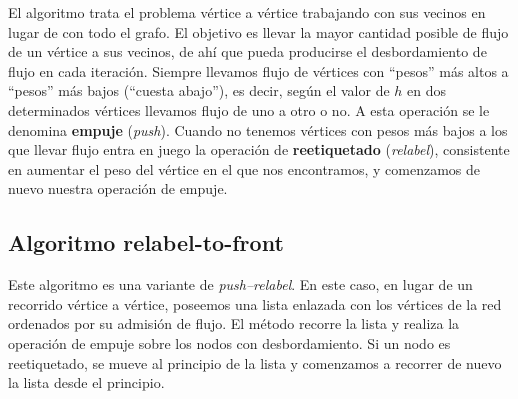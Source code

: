 El algoritmo trata el problema vértice a vértice trabajando con sus vecinos en lugar de con todo el grafo. El objetivo es llevar la mayor cantidad posible de flujo de un vértice a sus vecinos, de ahí que pueda producirse el desbordamiento de flujo en cada iteración. Siempre llevamos flujo de vértices con ``pesos'' más altos a ``pesos'' más bajos (``cuesta abajo''), es decir, según el valor de $h$ en dos determinados vértices llevamos flujo de uno a otro o no. A esta operación se le denomina \textbf{empuje} (\textit{push}). Cuando no tenemos vértices con pesos más bajos a los que llevar flujo entra en juego la operación de \textbf{reetiquetado} (\textit{relabel}), consistente en aumentar el peso del vértice en el que nos encontramos, y comenzamos de nuevo nuestra operación de empuje.

\subsection{Algoritmo relabel-to-front}

Este algoritmo es una variante de \textit{push–relabel}. En este caso, en lugar de un recorrido vértice a vértice, poseemos una lista enlazada con los vértices de la red ordenados por su admisión de flujo. El método recorre la lista y realiza la operación de empuje sobre los nodos con desbordamiento. Si un nodo es reetiquetado, se mueve al principio de la lista y comenzamos a recorrer de nuevo la lista desde el principio.